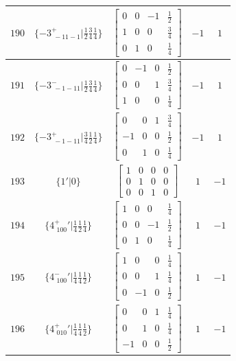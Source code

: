 \documentclass[fleqn,8pt]{jsarticle}
\begin{document}
\begin{longtable}{ccccc}
$ 190 $ & $ \{-3^{+}_{\,\,-11-1}|\frac{1}{2} \frac{3}{4} \frac{1}{4}\} $ & $ \begin{bmatrix} 0 & 0 & -1 & \frac{1}{2} \\ 1 & 0 & 0 & \frac{3}{4} \\ 0 & 1 & 0 & \frac{1}{4} \end{bmatrix} $ & $ -1 $ & $ 1 $ \\ \hline
$ 191 $ & $ \{-3^{-}_{\,\,-1-11}|\frac{1}{2} \frac{3}{4} \frac{1}{4}\} $ & $ \begin{bmatrix} 0 & -1 & 0 & \frac{1}{2} \\ 0 & 0 & 1 & \frac{3}{4} \\ 1 & 0 & 0 & \frac{1}{4} \end{bmatrix} $ & $ -1 $ & $ 1 $ \\ \hline
$ 192 $ & $ \{-3^{+}_{\,\,-1-11}|\frac{3}{4} \frac{1}{2} \frac{1}{4}\} $ & $ \begin{bmatrix} 0 & 0 & 1 & \frac{3}{4} \\ -1 & 0 & 0 & \frac{1}{2} \\ 0 & 1 & 0 & \frac{1}{4} \end{bmatrix} $ & $ -1 $ & $ 1 $ \\ \hline
$ 193 $ & $ \{1{}'|0\} $ & $ \begin{bmatrix} 1 & 0 & 0 & 0 \\ 0 & 1 & 0 & 0 \\ 0 & 0 & 1 & 0 \end{bmatrix} $ & $ 1 $ & $ -1 $ \\ \hline
$ 194 $ & $ \{4^{+}_{\,\,100}{}'|\frac{1}{4} \frac{1}{2} \frac{1}{4}\} $ & $ \begin{bmatrix} 1 & 0 & 0 & \frac{1}{4} \\ 0 & 0 & -1 & \frac{1}{2} \\ 0 & 1 & 0 & \frac{1}{4} \end{bmatrix} $ & $ 1 $ & $ -1 $ \\ \hline
$ 195 $ & $ \{4^{-}_{\,\,100}{}'|\frac{1}{4} \frac{1}{4} \frac{1}{2}\} $ & $ \begin{bmatrix} 1 & 0 & 0 & \frac{1}{4} \\ 0 & 0 & 1 & \frac{1}{4} \\ 0 & -1 & 0 & \frac{1}{2} \end{bmatrix} $ & $ 1 $ & $ -1 $ \\ \hline
$ 196 $ & $ \{4^{+}_{\,\,010}{}'|\frac{1}{4} \frac{1}{4} \frac{1}{2}\} $ & $ \begin{bmatrix} 0 & 0 & 1 & \frac{1}{4} \\ 0 & 1 & 0 & \frac{1}{4} \\ -1 & 0 & 0 & \frac{1}{2} \end{bmatrix} $ & $ 1 $ & $ -1 $ \\ \hline

\end{longtable}
\end{document}
